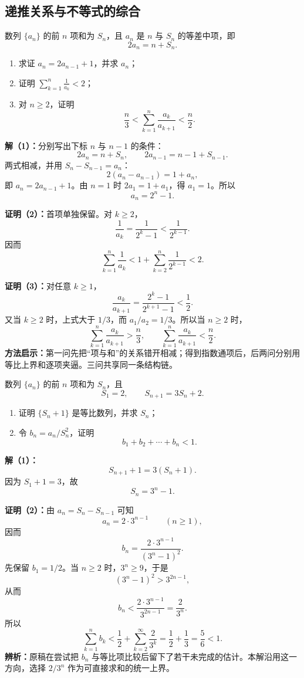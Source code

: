 \subsection{递推关系与不等式的综合}

\begin{examplebox}
  数列 $\{a_n\}$ 的前 $n$ 项和为 $S_n$，且 $a_n$ 是 $n$ 与 $S_n$ 的等差中项，即
  \[
    2a_n=n+S_n.
  \]
  \begin{enumerate}
    \item 求证 $a_n=2a_{n-1}+1$，并求 $a_n$；
    \item 证明 $\displaystyle\sum_{k=1}^{n}\frac1{a_k}<2$；
    \item 对 $n\ge2$，证明
      \[
        \frac n3<\sum_{k=1}^{n}\frac{a_k}{a_{k+1}}<\frac n2.
      \]
  \end{enumerate}

  \textbf{解（1）：}分别写出下标 $n$ 与 $n-1$ 的条件：
  \[
    2a_n=n+S_n,\qquad 2a_{n-1}=n-1+S_{n-1}.
  \]
  两式相减，并用 $S_n-S_{n-1}=a_n$：
  \[
    2(a_n-a_{n-1})=1+a_n,
  \]
  即 $a_n=2a_{n-1}+1$。由 $n=1$ 时 $2a_1=1+a_1$，得 $a_1=1$。所以
  \[
    \boxed{a_n=2^n-1}.
  \]

  \textbf{证明（2）：}首项单独保留。对 $k\ge2$，
  \[
    \frac1{a_k}=\frac1{2^k-1}<\frac1{2^{k-1}}.
  \]
  因而
  \[
    \sum_{k=1}^{n}\frac1{a_k}
      <1+\sum_{k=2}^{n}\frac1{2^{k-1}}<2.
  \]

  \textbf{证明（3）：}对任意 $k\ge1$，
  \[
    \frac{a_k}{a_{k+1}}
      =\frac{2^k-1}{2^{k+1}-1}<\frac12.
  \]
  又当 $k\ge2$ 时，上式大于 $1/3$，而 $a_1/a_2=1/3$。所以当 $n\ge2$ 时，
  \[
    \sum_{k=1}^{n}\frac{a_k}{a_{k+1}}
      >\frac n3,
    \qquad
    \sum_{k=1}^{n}\frac{a_k}{a_{k+1}}
      <\frac n2.
  \]
  \textbf{方法启示：}第一问先把“项与和”的关系错开相减；得到指数通项后，后两问分别用等比上界和逐项夹逼。三问共享同一条结构链。
\end{examplebox}

\begin{examplebox}
  数列 $\{a_n\}$ 的前 $n$ 项和为 $S_n$，且
  \[
    S_1=2,\qquad S_{n+1}=3S_n+2.
  \]
  \begin{enumerate}
    \item 证明 $\{S_n+1\}$ 是等比数列，并求 $S_n$；
    \item 令 $b_n=a_n/S_n^2$，证明
      \[
        b_1+b_2+\cdots+b_n<1.
      \]
  \end{enumerate}

  \textbf{解（1）：}
  \[
    S_{n+1}+1=3(S_n+1).
  \]
  因为 $S_1+1=3$，故
  \[
    \boxed{S_n=3^n-1}.
  \]

  \textbf{证明（2）：}由 $a_n=S_n-S_{n-1}$ 可知
  \[
    a_n=2\cdot3^{n-1}\qquad(n\ge1),
  \]
  因而
  \[
    b_n=\frac{2\cdot3^{n-1}}{(3^n-1)^2}.
  \]
  先保留 $b_1=1/2$。当 $n\ge2$ 时，$3^n\ge9$，于是
  \[
    (3^n-1)^2>3^{2n-1},
  \]
  从而
  \[
    b_n<\frac{2\cdot3^{n-1}}{3^{2n-1}}=\frac2{3^n}.
  \]
  所以
  \[
    \sum_{k=1}^{n}b_k
      <\frac12+\sum_{k=2}^{\infty}\frac2{3^k}
      =\frac12+\frac13
      =\frac56<1.
  \]
  \textbf{辨析：}原稿在尝试把 $b_n$ 与等比项比较后留下了若干未完成的估计。本解沿用这一方向，选择 $2/3^n$ 作为可直接求和的统一上界。
\end{examplebox}

